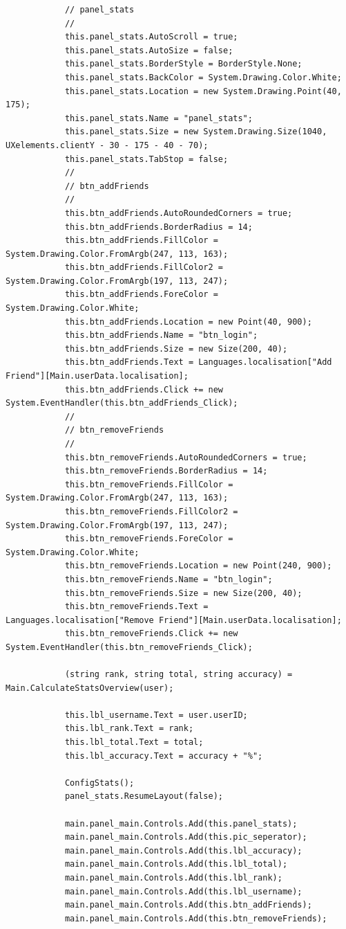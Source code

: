 \documentclass{article}
\begin{document}
\begin{verbatim}
			// panel_stats
			// 
			this.panel_stats.AutoScroll = true;
			this.panel_stats.AutoSize = false;
			this.panel_stats.BorderStyle = BorderStyle.None;
			this.panel_stats.BackColor = System.Drawing.Color.White;
			this.panel_stats.Location = new System.Drawing.Point(40, 175);
			this.panel_stats.Name = "panel_stats";
			this.panel_stats.Size = new System.Drawing.Size(1040, UXelements.clientY - 30 - 175 - 40 - 70);
			this.panel_stats.TabStop = false;
			//
			// btn_addFriends
			//
			this.btn_addFriends.AutoRoundedCorners = true;
			this.btn_addFriends.BorderRadius = 14;
			this.btn_addFriends.FillColor = System.Drawing.Color.FromArgb(247, 113, 163);
			this.btn_addFriends.FillColor2 = System.Drawing.Color.FromArgb(197, 113, 247);
			this.btn_addFriends.ForeColor = System.Drawing.Color.White;
			this.btn_addFriends.Location = new Point(40, 900);
			this.btn_addFriends.Name = "btn_login";
			this.btn_addFriends.Size = new Size(200, 40);
			this.btn_addFriends.Text = Languages.localisation["Add Friend"][Main.userData.localisation];
			this.btn_addFriends.Click += new System.EventHandler(this.btn_addFriends_Click);
			//
			// btn_removeFriends
			//
			this.btn_removeFriends.AutoRoundedCorners = true;
			this.btn_removeFriends.BorderRadius = 14;
			this.btn_removeFriends.FillColor = System.Drawing.Color.FromArgb(247, 113, 163);
			this.btn_removeFriends.FillColor2 = System.Drawing.Color.FromArgb(197, 113, 247);
			this.btn_removeFriends.ForeColor = System.Drawing.Color.White;
			this.btn_removeFriends.Location = new Point(240, 900);
			this.btn_removeFriends.Name = "btn_login";
			this.btn_removeFriends.Size = new Size(200, 40);
			this.btn_removeFriends.Text = Languages.localisation["Remove Friend"][Main.userData.localisation];
			this.btn_removeFriends.Click += new System.EventHandler(this.btn_removeFriends_Click);

			(string rank, string total, string accuracy) = Main.CalculateStatsOverview(user);

			this.lbl_username.Text = user.userID;
			this.lbl_rank.Text = rank;
			this.lbl_total.Text = total;
			this.lbl_accuracy.Text = accuracy + "%";

			ConfigStats();
			panel_stats.ResumeLayout(false);

			main.panel_main.Controls.Add(this.panel_stats);
			main.panel_main.Controls.Add(this.pic_seperator);
			main.panel_main.Controls.Add(this.lbl_accuracy);
			main.panel_main.Controls.Add(this.lbl_total);
			main.panel_main.Controls.Add(this.lbl_rank);
			main.panel_main.Controls.Add(this.lbl_username);
			main.panel_main.Controls.Add(this.btn_addFriends);
			main.panel_main.Controls.Add(this.btn_removeFriends);


\end{verbatim}
\end{document}
